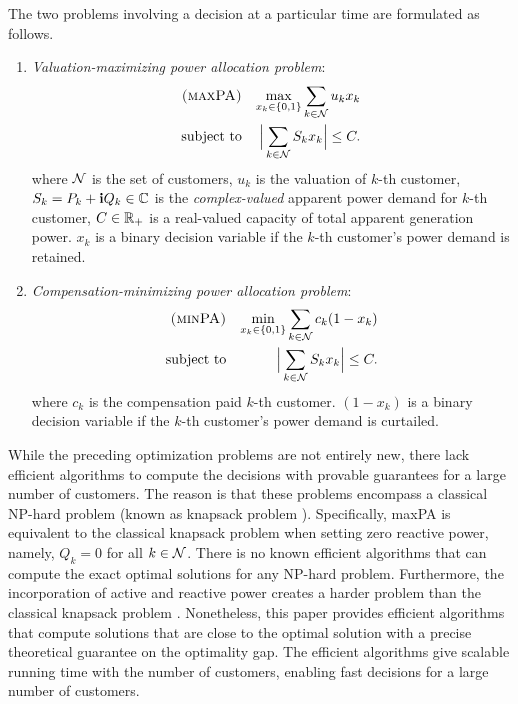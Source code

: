 The two problems involving a decision at a particular time are formulated as follows.
\begin{enumerate}
 
\item
{\em Valuation-maximizing power allocation problem}: %
\begin{eqnarray}
\textsc{(maxPA)} & &  \displaystyle \max_{x_k \in \{0, 1 \}} \sum_{k\in{\cal N}}u_k x_k \label{DAP}\\
\text{subject to}& &  \displaystyle \Big|\sum_{k\in {\cal N}}S_k x_k\Big| \le C. \label{maxPA}
\end{eqnarray}
where ${\cal N}$ is the set of customers, $u_k$ is the valuation of $k$-th customer, $S_k = P_k + {\bf i} Q_k \in\mathbb C$ is the {\em complex-valued} apparent power demand for $k$-th customer, $C \in\mathbb R_+$ is a real-valued capacity of total apparent generation power. $x_k$ is a binary decision variable if the $k$-th customer's power demand is retained.


\item
{\em Compensation-minimizing power allocation problem}: %
\begin{eqnarray}
\textsc{(minPA)} & &  \displaystyle \min_{x_k \in \{0, 1 \}} \sum_{k\in{\cal N}}c_k (1-x_k) \label{DAP}\\
\text{subject to}& &  \displaystyle \Big|\sum_{k\in {\cal N}}S_k x_k\Big| \le C. \label{C1}
\end{eqnarray}
where $c_k$ is the compensation paid $k$-th customer. $(1-x_k)$ is a binary decision variable if the $k$-th customer's power demand is curtailed.

\end{enumerate}

While the preceding optimization problems are not entirely new, there lack efficient algorithms to compute the decisions with provable guarantees for a large number of customers. The reason is that these problems encompass a classical NP-hard problem (known as knapsack problem \cite{KSbook}). Specifically, {\sc maxPA} is equivalent to the classical knapsack problem when setting zero reactive power, namely, $Q_k = 0$ for all $k \in {\cal N}$. There is no known efficient algorithms that can compute the exact optimal solutions for any NP-hard problem. Furthermore, the incorporation of active and reactive power creates a harder problem than the classical knapsack problem \cite{CKM14}. Nonetheless, this paper provides efficient algorithms that compute solutions that are close to the optimal solution with a precise theoretical guarantee on the optimality gap. The efficient algorithms give scalable running time with the number of customers, enabling fast decisions for a large number of customers. 




